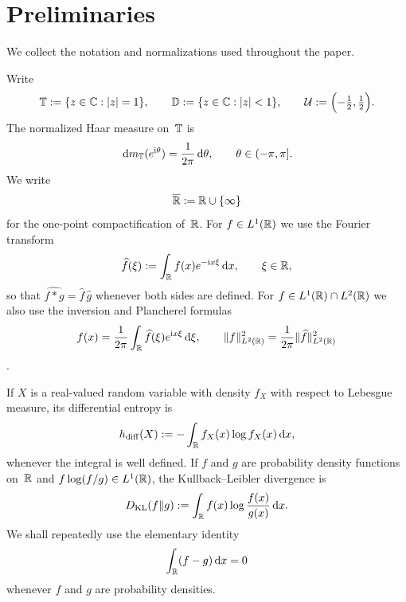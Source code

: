 \section{Preliminaries}\label{sec:preliminaries}

We collect the notation and normalizations used throughout the paper.

Write
\[
\mathbb{T}:=\{z\in\mathbb{C}:\lvert z\rvert=1\},\qquad
\mathbb{D}:=\{z\in\mathbb{C}:\lvert z\rvert<1\},\qquad
\mathcal{U}:=\Bigl(-\tfrac12,\tfrac12\Bigr).
\]
The normalized Haar measure on~$\mathbb{T}$ is
\[
\,\mathrm{d} m_{\mathbb{T}}(e^{\mathrm{i}\theta})=\frac{1}{2\pi}\,\mathrm{d}\theta,
\qquad
\theta\in(-\pi,\pi].
\]
We write
\[
\overline{\mathbb{R}}:=\mathbb{R}\cup\{\infty\}
\]
for the one-point compactification of~$\mathbb{R}$.  For $f\in L^{1}(\mathbb{R})$ we
use the Fourier transform
\[
\widehat f(\xi):=\int_{\mathbb{R}}f(x)e^{-\mathrm{i} x\xi}\,\mathrm{d} x,
\qquad \xi\in\mathbb{R},
\]
so that $\widehat{f*g}=\widehat f\,\widehat g$ whenever both sides are
defined.
For $f\in L^{1}(\mathbb{R})\cap L^{2}(\mathbb{R})$ we also use the inversion and
Plancherel formulas
\[
f(x)=\frac{1}{2\pi}\int_{\mathbb{R}}\widehat f(\xi)e^{\mathrm{i} x\xi}\,\mathrm{d}\xi,
\qquad
\|f\|_{L^2(\mathbb{R})}^{2}=\frac{1}{2\pi}\|\widehat f\|_{L^2(\mathbb{R})}^{2}
\]
\cite[Chapter~I]{Stein1971}.

If $X$ is a real-valued random variable with density $f_X$ with respect
to Lebesgue measure, its differential entropy is
\[
h_{\mathrm{diff}}(X):=-\int_{\mathbb{R}}f_X(x)\log f_X(x)\,\mathrm{d} x,
\]
whenever the integral is well defined.  If $f$ and $g$ are probability
density functions on~$\mathbb{R}$ and $f\log(f/g)\in L^1(\mathbb{R})$, the
Kullback--Leibler divergence is
\[
D_{\mathrm{KL}}(f\|g):=\int_{\mathbb{R}}f(x)\log\frac{f(x)}{g(x)}\,\mathrm{d} x.
\]
We shall repeatedly use the elementary identity
\[
\int_{\mathbb{R}}(f-g)\,\mathrm{d} x=0
\]
whenever $f$ and $g$ are probability densities.

